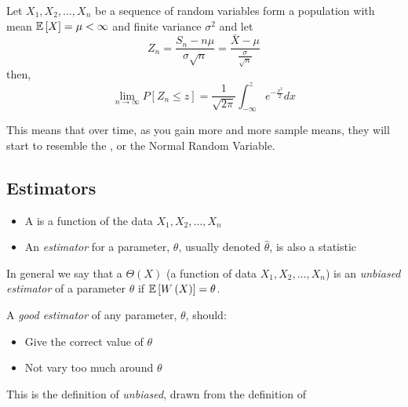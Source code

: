 		\begin{theorem} \label{thm:Central Limit Theorem}
			Let $X_{1},X_{2},\ldots,X_{n}$ be a sequence of  random variables form a population with mean $\operatorname{\mathbb{E}} \left[ X \right] = \mu < \infty$ and finite variance $\sigma^{2}$ and let
			\begin{equation*}
				Z_{n} = \frac{S_{n} - n\mu}{\sigma \sqrt{n}} = \frac{\bar{X} - \mu}{\frac{\sigma}{\sqrt{n}}}
			\end{equation*}
			then,
			\begin{equation} \label{eq:Central Limit Theorem}
				\lim\limits_{n \rightarrow \infty} P \left[ Z_{n} \leq z \right] = \frac{1}{\sqrt{2 \pi}} \int_{-\infty}^{z} e^{-\frac{x^{2}}{2}} dx
			\end{equation}
			\begin{remark*}
				This means that over time, as you gain more and more sample means, they will start to resemble the , or the Normal Random Variable.
			\end{remark*}
		\end{theorem}
	
	\subsection{Estimators} \label{subsec:Estimators}
		\begin{itemize}[noitemsep, nolistsep]
			\item A  is a function of the data $X_{1},X_{2},\ldots,X_{n}$
			\item An \emph{estimator} for a parameter, $\theta$, usually denoted $\hat{\theta}$, is also a statistic
		\end{itemize}
		\begin{definition} \label{def:Unbiased Estimator}
			In general we say that a  $\Theta (X)$ (a function of data $X_{1},X_{2},\ldots,X_{n}$) is an \emph{unbiased estimator} of a parameter $\theta$ if $\operatorname{\mathbb{E}} \left[ W \left( X \right) \right] = \theta$.
			\begin{remark}
				A \emph{good estimator} of any parameter, $\theta$, should:
				\begin{itemize}[noitemsep, nolistsep]
					\item Give the correct value of $\theta$
					\item Not vary too much around $\theta$
				\end{itemize}
			\end{remark}
			\begin{remark}
				This is the definition of \emph{unbiased}, drawn from the definition of 
			\end{remark}
		\end{definition}
	
